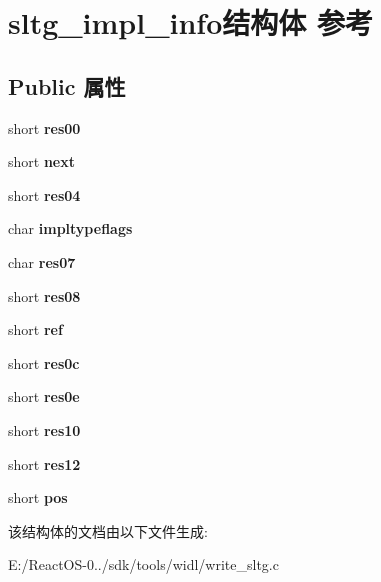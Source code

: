 \hypertarget{structsltg__impl__info}{}\section{sltg\+\_\+impl\+\_\+info结构体 参考}
\label{structsltg__impl__info}
\subsection*{Public 属性}
\begin{DoxyCompactItemize}
\item 
\mbox{\label{structsltg__impl__info_a4b6fbb5c009f6683f35e17ad7329fbe7}} 
short {\bfseries res00}
\item 
\mbox{\label{structsltg__impl__info_a9fce7565c42d774380d8e18db9aca520}} 
short {\bfseries next}
\item 
\mbox{\label{structsltg__impl__info_aab54d9b1dca1bc2d4348c217074babae}} 
short {\bfseries res04}
\item 
\mbox{\label{structsltg__impl__info_a574a8a2f3d1cea9e1936a55652a9c95e}} 
char {\bfseries impltypeflags}
\item 
\mbox{\label{structsltg__impl__info_a5dd522eb15f710ff82ada5a47353127d}} 
char {\bfseries res07}
\item 
\mbox{\label{structsltg__impl__info_ae3a23b1e385eec53098b43919e615488}} 
short {\bfseries res08}
\item 
\mbox{\label{structsltg__impl__info_afe5fccb45b305ed2f38186230ff1c602}} 
short {\bfseries ref}
\item 
\mbox{\label{structsltg__impl__info_adeb9ef44c8553d4c23bbd040cb7994d4}} 
short {\bfseries res0c}
\item 
\mbox{\label{structsltg__impl__info_a4b441cab7d63d0525b57bf50d1157b83}} 
short {\bfseries res0e}
\item 
\mbox{\label{structsltg__impl__info_a630f6e10846243f0adc12c0d9942d3db}} 
short {\bfseries res10}
\item 
\mbox{\label{structsltg__impl__info_a264c87b1d247f8c1876d37d7d44cc843}} 
short {\bfseries res12}
\item 
\mbox{\label{structsltg__impl__info_ad47bdc4564b74398916d447db5fd6ce8}} 
short {\bfseries pos}
\end{DoxyCompactItemize}


该结构体的文档由以下文件生成\+:\begin{DoxyCompactItemize}
\item 
E\+:/\+React\+O\+S-\/0../sdk/tools/widl/write\+\_\+sltg.\+c\end{DoxyCompactItemize}
